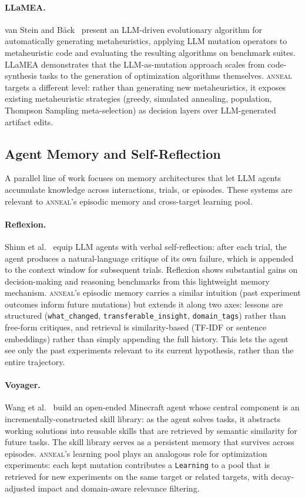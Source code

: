 \paragraph{LLaMEA.}
van Stein and B\"ack~\cite{vanstein2024llamea} present an LLM-driven evolutionary algorithm for automatically generating metaheuristics, applying LLM mutation operators to metaheuristic code and evaluating the resulting algorithms on benchmark suites.
LLaMEA demonstrates that the LLM-as-mutation approach scales from code-synthesis tasks to the generation of optimization algorithms themselves.
\textsc{anneal} targets a different level: rather than generating new metaheuristics, it exposes existing metaheuristic strategies (greedy, simulated annealing, population, Thompson Sampling meta-selection) as decision layers over LLM-generated artifact edits.

\subsection{Agent Memory and Self-Reflection}

A parallel line of work focuses on memory architectures that let LLM agents accumulate knowledge across interactions, trials, or episodes.
These systems are relevant to \textsc{anneal}'s episodic memory and cross-target learning pool.

\paragraph{Reflexion.}
Shinn et al.~\cite{shinn2023reflexion} equip LLM agents with verbal self-reflection: after each trial, the agent produces a natural-language critique of its own failure, which is appended to the context window for subsequent trials.
Reflexion shows substantial gains on decision-making and reasoning benchmarks from this lightweight memory mechanism.
\textsc{anneal}'s episodic memory carries a similar intuition (past experiment outcomes inform future mutations) but extends it along two axes: lessons are structured (\texttt{what\_changed}, \texttt{transferable\_insight}, \texttt{domain\_tags}) rather than free-form critiques, and retrieval is similarity-based (TF-IDF or sentence embeddings) rather than simply appending the full history.
This lets the agent see only the past experiments relevant to its current hypothesis, rather than the entire trajectory.

\paragraph{Voyager.}
Wang et al.~\cite{wang2023voyager} build an open-ended Minecraft agent whose central component is an incrementally-constructed skill library: as the agent solves tasks, it abstracts working solutions into reusable skills that are retrieved by semantic similarity for future tasks.
The skill library serves as a persistent memory that survives across episodes.
\textsc{anneal}'s learning pool plays an analogous role for optimization experiments: each kept mutation contributes a \texttt{Learning} to a pool that is retrieved for new experiments on the same target or related targets, with decay-adjusted impact and domain-aware relevance filtering.

